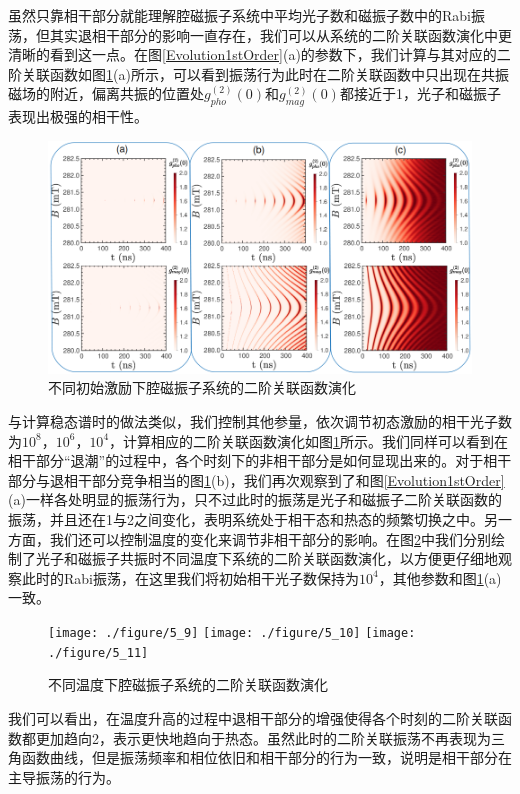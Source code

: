 虽然只靠相干部分就能理解腔磁振子系统中平均光子数和磁振子数中的Rabi振荡，但其实退相干部分的影响一直存在，我们可以从系统的二阶关联函数演化中更清晰的看到这一点。在图\ref{Evolution1stOrder}(a)的参数下，我们计算与其对应的二阶关联函数如图\ref{Evolution2edOrder}(a)所示，可以看到振荡行为此时在二阶关联函数中只出现在共振磁场的附近，偏离共振的位置处$g_{pho}^{(2)}(0)$和$g_{mag}^{(2)}(0)$都接近于1，光子和磁振子表现出极强的相干性。
\begin{figure}[htbp]
	\centering
	\includegraphics[width=3\basefigurewidth,clip]{./figure/5_3}
	\caption{不同初始激励下腔磁振子系统的二阶关联函数演化} 
	\label{Evolution2edOrder}
\end{figure}
与计算稳态谱时的做法类似，我们控制其他参量，依次调节初态激励的相干光子数为$10^8$，$10^6$，$10^4$，计算相应的二阶关联函数演化如图\ref{Evolution2edOrder}所示。我们同样可以看到在相干部分“退潮”的过程中，各个时刻下的非相干部分是如何显现出来的。对于相干部分与退相干部分竞争相当的图\ref{Evolution2edOrder}(b)，我们再次观察到了和图\ref{Evolution1stOrder}(a)一样各处明显的振荡行为，只不过此时的振荡是光子和磁振子二阶关联函数的振荡，并且还在1与2之间变化，表明系统处于相干态和热态的频繁切换之中。另一方面，我们还可以控制温度的变化来调节非相干部分的影响。在图\ref{Evolution2edOrderTVary}中我们分别绘制了光子和磁振子共振时不同温度下系统的二阶关联函数演化，以方便更仔细地观察此时的Rabi振荡，在这里我们将初始相干光子数保持为$10^4$，其他参数和图\ref{Evolution2edOrder}(a)一致。
\begin{figure}[htbp]
	\centering
	\texttt{[image: ./figure/5\_9]}
	\texttt{[image: ./figure/5\_10]}
	\texttt{[image: ./figure/5\_11]}
	\caption{不同温度下腔磁振子系统的二阶关联函数演化} 
	\label{Evolution2edOrderTVary}
\end{figure}
我们可以看出，在温度升高的过程中退相干部分的增强使得各个时刻的二阶关联函数都更加趋向2，表示更快地趋向于热态。虽然此时的二阶关联振荡不再表现为三角函数曲线，但是振荡频率和相位依旧和相干部分的行为一致，说明是相干部分在主导振荡的行为。

